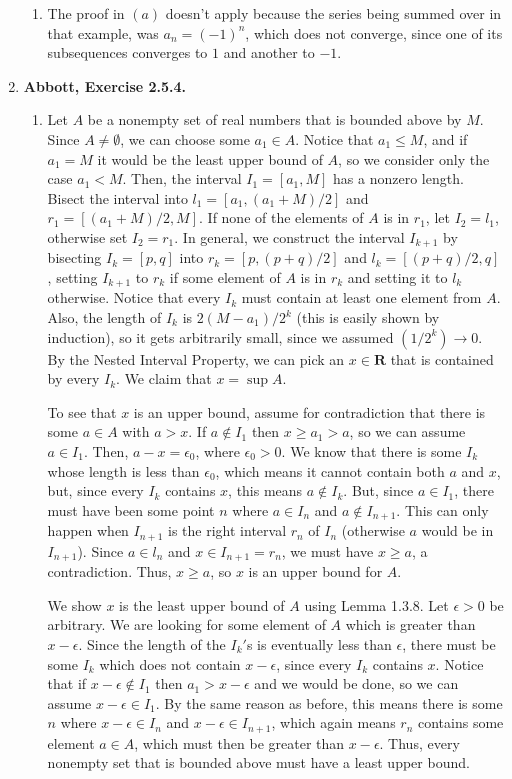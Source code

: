 \documentclass{article}
\newcommand{\R}{\mathbf{R}}
\newcommand{\exc}[2][Abbott]{\item \textbf{#1, Exercise #2.}}
\newcommand{\lep}[1][L]{#1et $\epsilon > 0$ be arbitrary}
\begin{document}
\begin{enumerate}
\begin{enumerate}
        \item The proof in $(a)$ doesn't apply because the series being summed over in that example, was $a_n = (-1)^n$, which does not converge, since one of its subsequences converges to $1$ and another to $-1$.
    \end{enumerate}
    
    \exc{2.5.4}
    \begin{enumerate}
        \item Let $A$ be a nonempty set of real numbers that is bounded above by $M$. Since $A \neq \emptyset$, we can choose some $a_1 \in A$. Notice that $a_1 \leq M$, and if $a_1 = M$ it would be the least upper bound of $A$, so we consider only the case $a_1 < M$. Then, the interval $I_1 =[a_1, M]$ has a nonzero length. Bisect the interval into $l_1 = [a_1, (a_1+M)/2]$ and $r_1 = [(a_1+M)/2, M]$. If none of the elements of $A$ is in $r_1$, let $I_2 = l_1$, otherwise set $I_2 = r_1$. In general, we construct the interval $I_{k+1}$ by bisecting $I_k = [p, q]$ into $r_k=[p, (p+q)/2]$ and $l_k = [(p+q)/2, q]$, setting $I_{k+1}$ to $r_k$ if some element of $A$ is in $r_k$ and setting it to $l_k$ otherwise. Notice that every $I_k$ must contain at least one element from $A$. Also, the length of $I_k$ is $2 (M-a_1)/2^k$ (this is easily shown by induction), so it gets arbitrarily small, since we assumed $(1/2^k) \to 0$. By the Nested Interval Property, we can pick an $x \in \R$ that is contained by every $I_k$. We claim that $x = \sup A$.
        
        To see that $x$ is an upper bound, assume for contradiction that there is some $a \in A$ with $a > x$. If $a \notin I_1$ then $x \geq a_1 > a$, so we can assume $a \in I_1$. Then, $a-x = \epsilon_0$, where $\epsilon_0 > 0$. We know that there is some $I_k$ whose length is less than $\epsilon_0$, which means it cannot contain both $a$ and $x$, but, since every $I_k$ contains $x$, this means $a \notin I_k$. But, since $a \in I_1$, there must have been some point $n$ where $a \in I_n$ and $a \notin I_{n+1}$. This can only happen when $I_{n+1}$ is the right interval $r_n$ of $I_n$ (otherwise $a$ would be in $I_{n+1}$). Since $a \in l_n$ and $x \in I_{n+1} = r_n$, we must have $x \geq a$, a contradiction. Thus, $x \geq a$, so $x$ is an upper bound for $A$.
        
        We show $x$ is the least upper bound of $A$ using Lemma 1.3.8. \lep. We are looking for some element of $A$ which is greater than $x-\epsilon$. Since the length of the $I_k'$s is eventually less than $\epsilon$, there must be some $I_k$ which does not contain $x-\epsilon$, since every $I_k$ contains $x$. Notice that if $x-\epsilon \notin I_1$ then $a_1 > x-\epsilon$ and we would be done, so we can assume $x-\epsilon \in I_1$. By the same reason as before, this means there is some $n$ where $x-\epsilon \in I_n$ and $x-\epsilon \in I_{n+1}$, which again means $r_n$ contains some element $a \in A$, which must then be greater than $x-\epsilon$. Thus, every nonempty set that is bounded above must have a least upper bound.
        

\end{enumerate}
\end{enumerate}
\end{document}
